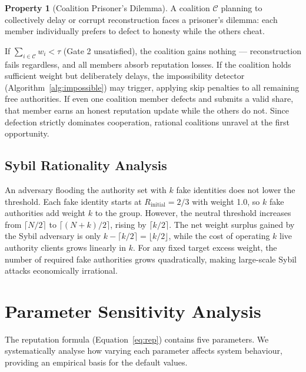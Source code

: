 \documentclass[12pt,a4paper]{article}
\theoremstyle{definition}
\newtheorem{property}{Property}[section]
\theoremstyle{remark}
\begin{document}
\begin{property}[Coalition Prisoner's Dilemma]
\label{prop:coalition}
  A coalition $\mathcal{C}$ planning to collectively delay or corrupt
  reconstruction faces a prisoner's dilemma: each member individually
  prefers to defect to honesty while the others cheat.
\end{property}

If $\sum_{i \in \mathcal{C}} w_i < \tau$ (Gate 2 unsatisfied), the coalition
gains nothing — reconstruction fails regardless, and all members absorb
reputation losses.
If the coalition holds sufficient weight but deliberately delays, the
impossibility detector (Algorithm~\ref{alg:impossible}) may trigger,
applying skip penalties to all remaining free authorities.
If even one coalition member defects and submits a valid share, that
member earns an honest reputation update while the others do not.
Since defection strictly dominates cooperation, rational coalitions
unravel at the first opportunity.

\subsection{Sybil Rationality Analysis}

An adversary flooding the authority set with $k$ fake identities does
not lower the threshold.
Each fake identity starts at $R_{\text{initial}} = 2/3$ with weight 1.0,
so $k$ fake authorities add weight $k$ to the group.
However, the neutral threshold increases from $\lceil N/2 \rceil$ to
$\lceil (N+k)/2 \rceil$, rising by $\lceil k/2 \rceil$.
The net weight surplus gained by the Sybil adversary is only
$k - \lceil k/2 \rceil = \lfloor k/2 \rfloor$,
while the cost of operating $k$ live authority clients grows linearly in $k$.
For any fixed target excess weight, the number of required fake authorities
grows quadratically, making large-scale Sybil attacks economically irrational.

\section{Parameter Sensitivity Analysis}
\label{sec:sensitivity}

The reputation formula (Equation~\eqref{eq:rep}) contains five parameters.
We systematically analyse how varying each parameter affects system behaviour,
providing an empirical basis for the default values.
\end{document}
